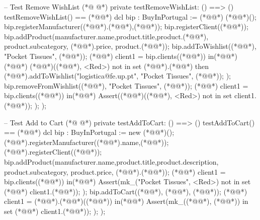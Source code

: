 \begin{vdmpp}[breaklines=true]
 -- Test Remove WishList
(*@
\label{testRemoveWishList:228}
@*)
 private testRemoveWishList: () ==> ()
 testRemoveWishList() == (*@\vdmnotcovered{(}@*)
  dcl bip : BuyInPortugal := (*@@*) (*@@*)();
  bip.registerManufacturer((*@@*).(*@@*),(*@@*));
  bip.registerClient((*@@*));
  bip.addProduct(manufacturer.name,product.title,product.(*@@*), product.subcategory, (*@@*).price, product.(*@@*));
  bip.addToWishlist((*@@*), "Pocket Tissues", (*@@*));
  (*@@*) client1 = bip.clients((*@@*))
  in(*@\vdmnotcovered{(}@*)
   (*@@*) (*@@*)((*@@*), <Red>) not in set (*@@*).(*@@*) then
    (*@@*).addToWishlist("logistica@fe.up.pt", "Pocket Tissues", (*@@*));
  );
  bip.removeFromWishlist((*@@*), "Pocket Tissues", (*@@*));
  (*@@*) client1 = bip.clients((*@@*))
  in(*@\vdmnotcovered{(}@*)
   Assert((*@@*)((*@@*), <Red>) not in set client1.(*@@*));
  );
 );
 
 -- Test Add to Cart
(*@
\label{testAddToCart:248}
@*)
 private testAddToCart: () ==> ()
 testAddToCart() == (*@\vdmnotcovered{(}@*)
  dcl bip : BuyInPortugal := new (*@@*)();
  (*@@*).registerManufacturer((*@@*).name,(*@@*));
  (*@@*).registerClient((*@@*));
  bip.addProduct(manufacturer.name,product.title,product.description, product.subcategory, product.price, (*@@*).(*@@*));
  (*@@*) client1 = bip.clients((*@@*))
  in(*@\vdmnotcovered{(}@*)
   Assert(mk_("Pocket Tissues", <Red>)  not in set (*@@*) client1.(*@@*));
  );
  bip.addToCart((*@@*), (*@@*), (*@@*));
  (*@@*) client1 = (*@@*).(*@@*)((*@@*))
  in(*@\vdmnotcovered{(}@*)
   Assert(mk_((*@@*), (*@@*)) in set (*@@*) client1.(*@@*));
  );
 );
 

\end{vdmpp}
